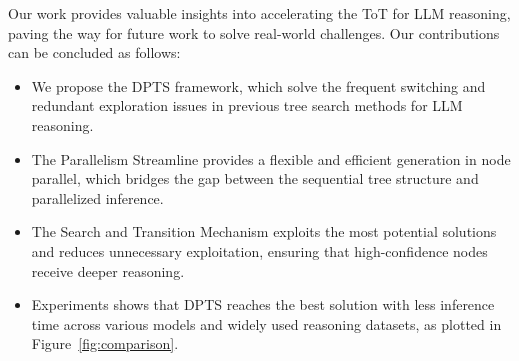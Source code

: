 


Our work provides valuable insights into accelerating the ToT for LLM reasoning, paving the way for future work to solve real-world challenges. 
Our contributions can be concluded as follows:
\begin{itemize}[itemsep=0pt,parsep=2pt,topsep=3pt]
    \item We propose the DPTS framework, which solve the frequent switching and redundant exploration issues in previous tree search methods for LLM reasoning. 
    \item The Parallelism Streamline provides a flexible and efficient generation in node parallel, which bridges the gap between the sequential tree structure and parallelized inference. 
    \item The Search and Transition Mechanism exploits the most potential solutions and reduces unnecessary exploitation, ensuring that high-confidence nodes receive deeper reasoning. 
    \item Experiments shows that DPTS reaches the best solution with less inference time across various models and widely used reasoning datasets, as plotted in Figure~\ref{fig:comparison}. 
\end{itemize}
